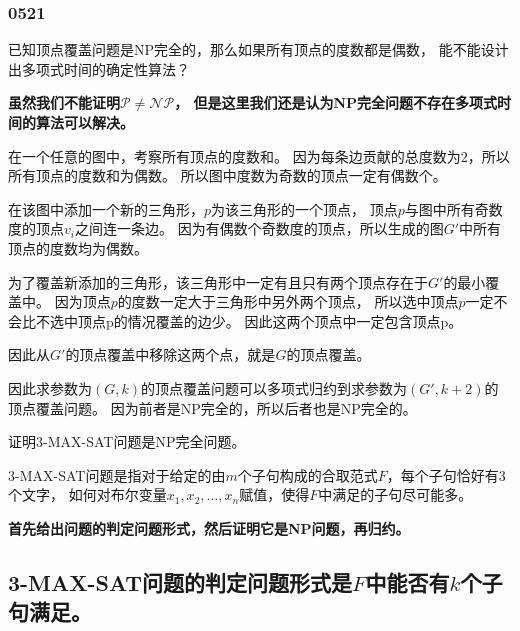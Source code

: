 \section{0521}\label{sec:0521}
\begin{questions}
    \question 已知顶点覆盖问题是NP完全的，那么如果所有顶点的度数都是偶数，
    能不能设计出多项式时间的确定性算法？

    \begin{solution}
        \textbf{
            \color{red}
            虽然我们不能证明$\mathcal{P} \ne \mathcal{NP}$，
            但是这里我们还是认为NP完全问题不存在多项式时间的算法可以解决。
        }

        在一个任意的图中，考察所有顶点的度数和。
        因为每条边贡献的总度数为$2$，所以所有顶点的度数和为偶数。
        所以图中度数为奇数的顶点一定有偶数个。

        在该图中添加一个新的三角形，$p$为该三角形的一个顶点，
        顶点$p$与图中所有奇数度的顶点$v_i$之间连一条边。
        因为有偶数个奇数度的顶点，所以生成的图$G'$中所有顶点的度数均为偶数。

        为了覆盖新添加的三角形，该三角形中一定有且只有两个顶点存在于$G'$的最小覆盖中。
        因为顶点$p$的度数一定大于三角形中另外两个顶点，
        所以选中顶点$p$一定不会比不选中顶点p的情况覆盖的边少。
        因此这两个顶点中一定包含顶点p。

        因此从$G'$的顶点覆盖中移除这两个点，就是$G$的顶点覆盖。

        因此求参数为$(G,k)$的顶点覆盖问题可以多项式归约到求参数为$(G',k+2)$的顶点覆盖问题。
        因为前者是NP完全的，所以后者也是NP完全的。

    \end{solution}


    \question 证明3-MAX-SAT问题是NP完全问题。

    3-MAX-SAT问题是指对于给定的由$m$个子句构成的合取范式$F$，每个子句恰好有$3$个文字，
    如何对布尔变量$x_1,x_2, \dots ,x_n$赋值，使得$F$中满足的子句尽可能多。

    \begin{solution}

        \textbf{
            \color{red}
            首先给出问题的判定问题形式，然后证明它是NP问题，再归约。
        }


        \begin{parts}
            \part {
                3-MAX-SAT问题的判定问题形式是$F$中能否有$k$个子句满足。
            }

\end{parts}
\end{solution}
\end{questions}
